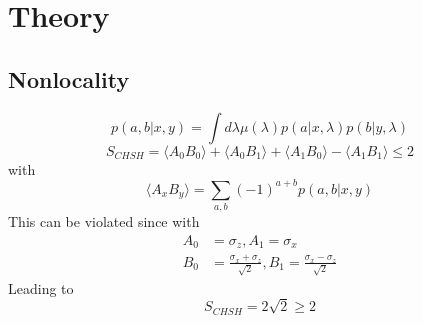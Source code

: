 \section{Theory}\label{Theory} 
\subsection{Nonlocality}
\begin{equation}
    p(a,b\vert x,y) = \int d\lambda \mu(\lambda) p(a\vert x,\lambda) p(b\vert y,\lambda)
\end{equation}
\begin{equation}
    S_{CHSH} = \langle A_0 B_0 \rangle + \langle A_0 B_1 \rangle + \langle A_1 B_0 \rangle -   \langle A_1 B_1 \rangle \leq 2
\end{equation}
with 
\begin{equation}
     \langle A_x B_y \rangle =  \sum_{a,b} (-1)^{a+b}p(a,b \vert x,y) 
\end{equation}
This can be violated since with 
\begin{equation}
    \begin{split}
        A_0& = \sigma_z , A_1 = \sigma_x\\
    B_0& = \frac{\sigma_x + \sigma_z}{\sqrt{2}},B_1 = \frac{\sigma_x - \sigma_z}{\sqrt{2}}
    \end{split}
\end{equation}
Leading to 
\begin{equation}
    S_{CHSH} = 2\sqrt{2} \geq 2
\end{equation}

